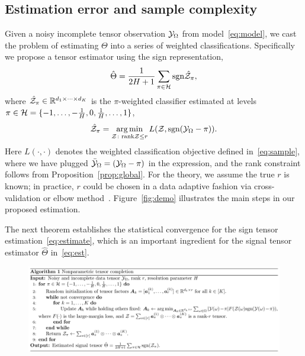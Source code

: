 \documentclass{article}
\theoremstyle{plain}
\theoremstyle{definition}
\def\sign{\textup{sgn}}
\begin{document}
\subsection{Estimation error and sample complexity}

Given a noisy incomplete tensor observation $\mathcal{Y}_\Omega$ from model~\eqref{eq:model}, we cast the problem of estimating $\Theta$ into a series of weighted classifications. Specifically we propose a tensor estimator using the sign representation,
\begin{equation}\label{eq:est}
\hat \Theta = {1\over 2H+1}\sum_{\pi \in \tH}\sign{\hat \tZ_\pi},
\end{equation}
where $\hat {\mathcal{Z}}_\pi\in\mathbb{R}^{d_1\times \dots\times d_K}$ is the $\pi$-weighted classifier estimated at levels $\pi \in \mathcal{H}=\{-1,\ldots,-{1\over H}, 0, {1\over H},\ldots,1\}$,
\begin{equation}\label{eq:estimate}
\hat \tZ_\pi = \argmin_{\tZ\colon \text{rank}\tZ\leq r} L(\tZ, \sign(\tY_\Omega-\pi)).
\end{equation}
Here $L(\cdot,\cdot)$ denotes the weighted classification objective defined in~\eqref{eq:sample}, where we have plugged $\bar {\mathcal{Y}}_\Omega=(\mathcal{Y}_\Omega-\pi)$ in the expression, and the rank constraint follows from Proposition~\ref{prop:global}. For the theory, we assume the true $r$ is known; in practice, $r$ could be chosen in a data adaptive fashion via cross-validation or elbow method~\cite{hastie2009elements}. Figure~\ref{fig:demo} illustrates the main steps in our proposed estimation. 

The next theorem establishes the statistical convergence for the sign tensor estimation~\eqref{eq:estimate}, which is an important ingredient for the signal tensor estimator $\hat \Theta$ in~\eqref{eq:est}. 

\begin{figure}[h!]
\vspace{-.4cm}
\includegraphics[width=\textwidth]{figure/algorithm.pdf}
\vspace{-.8cm}
\end{figure}
\end{document}
